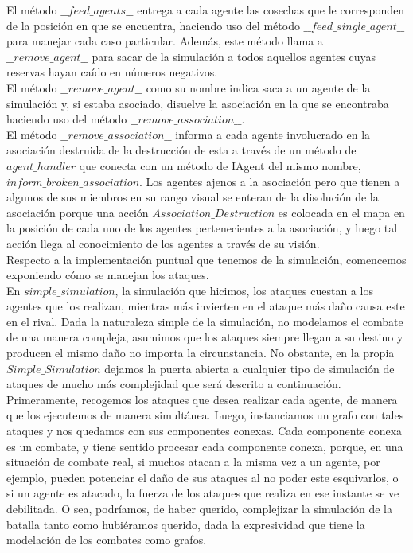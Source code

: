 \documentclass[11pt]{article}
\begin{document}
El método $\_\_feed\_agents\_\_$ entrega a cada agente las cosechas que le corresponden de la posición en que se encuentra, haciendo uso del método $\_\_feed\_single\_agent\_\_$ para manejar cada caso particular. Además, este método llama a $\_\_remove\_agent\_\_$ para sacar de la simulación a todos aquellos agentes cuyas reservas hayan caído en números negativos.\\
El método $\_\_remove\_agent\_\_$ como su nombre indica saca a un agente de la simulación y, si estaba asociado, disuelve la asociación en la que se encontraba haciendo uso del método $\_\_remove\_association\_\_$.\\
El método $\_\_remove\_association\_\_$ informa a cada agente involucrado en la asociación destruida de la destrucción de esta a través de un método de $agent\_handler$ que conecta con un método de IAgent del mismo nombre, $inform\_broken\_association$. Los agentes ajenos a la asociación pero que tienen a algunos de sus miembros en su rango visual se enteran de la disolución de la asociación porque una acción $Association\_Destruction$ es colocada en el mapa en la posición de cada uno de los agentes pertenecientes a la asociación, y luego tal acción llega al conocimiento de los agentes a través de su visión.\\
Respecto a la implementación puntual que tenemos de la simulación, comencemos exponiendo cómo se manejan los ataques.\\
En $simple\_simulation$, la simulación que hicimos, los ataques cuestan a los agentes que los realizan, mientras más invierten en el ataque más daño causa este en el rival. Dada la naturaleza simple de la simulación, no modelamos el combate de una manera compleja, asumimos que los ataques siempre llegan a su destino y producen el mismo daño no importa la circunstancia. No obstante, en la propia $Simple\_Simulation$ dejamos la puerta abierta a cualquier tipo de simulación de ataques de mucho más complejidad que será descrito a continuación.\\
Primeramente, recogemos los ataques que desea realizar cada agente, de manera que los ejecutemos de manera simultánea. Luego, instanciamos un grafo con tales ataques y nos quedamos con sus componentes conexas. Cada componente conexa es un combate, y tiene sentido procesar cada componente conexa, porque, en una situación de combate real, si muchos atacan a la misma vez a un agente, por ejemplo, pueden potenciar el daño de sus ataques al no poder este esquivarlos, o si un agente es atacado, la fuerza de los ataques que realiza en ese instante se ve debilitada. O sea, podríamos, de haber querido, complejizar la simulación de la batalla tanto como hubiéramos querido, dada la expresividad que tiene la modelación de los combates como grafos.\\
\end{document}
